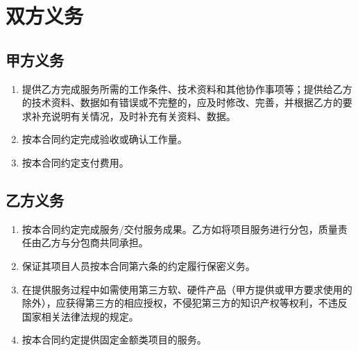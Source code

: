 \section{双方义务}

\subsection{甲方义务}
\begin{enumerate}
  \item 提供乙方完成服务所需的工作条件、技术资料和其他协作事项等；提供给乙方的技术资料、数据如有错误或不完整的，应及时修改、完善，并根据乙方的要求补充说明有关情况，及时补充有关资料、数据。
  \item 按本合同约定完成验收或确认工作量。
  \item 按本合同约定支付费用。
\end{enumerate}

\subsection{乙方义务}
\begin{enumerate}
  \item 按本合同约定完成服务/交付服务成果。乙方如将项目服务进行分包，质量责任由乙方与分包商共同承担。
  \item 保证其项目人员按本合同第六条的约定履行保密义务。
  \item 在提供服务过程中如需使用第三方软、硬件产品（甲方提供或甲方要求使用的除外），应获得第三方的相应授权，不侵犯第三方的知识产权等权利，不违反国家相关法律法规的规定。
  \item 按本合同约定提供固定金额类项目的服务。
\end{enumerate}
